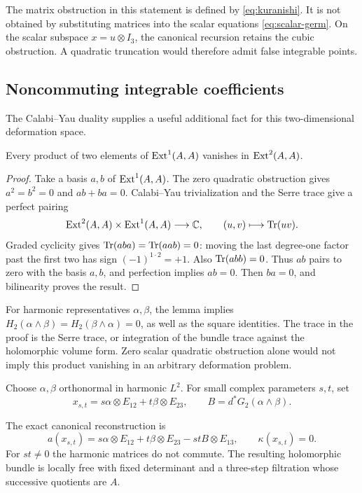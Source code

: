 The matrix obstruction in this statement is defined
by \eqref{eq:kuranishi}. It is not obtained by
substituting matrices into the scalar equations
\eqref{eq:scalar-germ}. On the scalar subspace
$x=u\otimes I_3$, the canonical recursion retains
the cubic obstruction. A quadratic truncation
would therefore admit false integrable points.

\subsection{Noncommuting integrable coefficients}
The Calabi--Yau duality supplies a useful additional
fact for this two-dimensional deformation space.

\begin{lemma}\label{lem:cup}
Every product of two elements of $\operatorname{Ext}^1(A,A)$
vanishes in $\operatorname{Ext}^2(A,A)$.
\end{lemma}

\begin{proof}
Take a basis $a,b$ of $\operatorname{Ext}^1(A,A)$. The zero
quadratic obstruction gives $a^2=b^2=0$ and
$ab+ba=0$. Calabi--Yau trivialization and the
Serre trace give a perfect pairing
\[
 \operatorname{Ext}^2(A,A)\times\operatorname{Ext}^1(A,A)\longrightarrow\mathbb C,
             \qquad (u,v)\longmapsto\operatorname{Tr}(uv).
\]
Graded cyclicity gives
$\operatorname{Tr}(aba)=\operatorname{Tr}(aab)=0$: moving the last degree-one
factor past the first two has sign
$(-1)^{1\cdot2}=+1$. Also $\operatorname{Tr}(abb)=0$.
Thus $ab$ pairs to zero with the basis $a,b$,
and perfection implies $ab=0$. Then $ba=0$,
and bilinearity proves the result.
\end{proof}

For harmonic representatives $\alpha,\beta$,
the lemma implies
$H_2(\alpha\wedge\beta)=H_2(\beta\wedge\alpha)=0$,
as well as the square identities. The trace in
the proof is the Serre trace, or integration of
the bundle trace against the holomorphic volume
form. Zero scalar quadratic obstruction alone
would not imply this product vanishing in an
arbitrary deformation problem.

Choose $\alpha,\beta$ orthonormal in harmonic
$L^2$. For small complex parameters $s,t$, set
\begin{equation}\label{eq:noncommuting-x}
 x_{s,t}=s\alpha\otimes E_{12}+t\beta\otimes E_{23},
 \qquad B=d^*G_2(\alpha\wedge\beta).
\end{equation}

\begin{proposition}\label{prop:noncommuting}
The exact canonical reconstruction is
\begin{equation}\label{eq:noncommuting-a}
 a(x_{s,t})=s\alpha\otimes E_{12}+t\beta\otimes E_{23}
                         -stB\otimes E_{13},\qquad
 \kappa(x_{s,t})=0.
\end{equation}
For $st\ne0$ the harmonic matrices do not commute.
The resulting holomorphic bundle is locally free
with fixed determinant and a three-step filtration
whose successive quotients are $A$.
\end{proposition}

